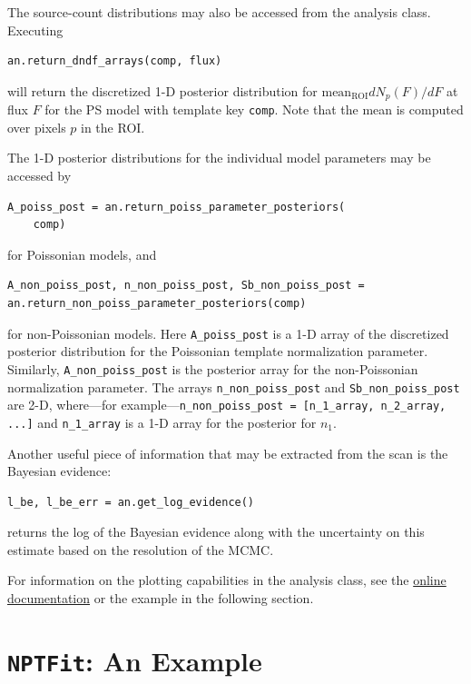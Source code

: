 The source-count distributions may also be accessed from the analysis class.  Executing
\begin{lstlisting}
an.return_dndf_arrays(comp, flux)
\end{lstlisting}
will return the discretized 1-D posterior distribution for $\text{mean}_\text{ROI} dN_p(F)/dF$ at flux $F$ for the PS model with template key \lstinline{comp}.  Note that the mean is computed over pixels $p$ in the ROI.  

The 1-D posterior distributions for the individual model parameters may be accessed by 
\begin{lstlisting}
A_poiss_post = an.return_poiss_parameter_posteriors(
    comp)
\end{lstlisting}
for Poissonian models, and 
\begin{lstlisting}
A_non_poiss_post, n_non_poiss_post, Sb_non_poiss_post = an.return_non_poiss_parameter_posteriors(comp)
\end{lstlisting}
for non-Poissonian models.  Here \lstinline{A_poiss_post} is a 1-D array of the discretized posterior distribution for the Poissonian template normalization parameter.  Similarly, \lstinline{A_non_poiss_post} is the posterior array for the non-Poissonian normalization parameter.  The arrays \lstinline{n_non_poiss_post} and \lstinline{Sb_non_poiss_post} are 2-D, where---for example---\mbox{\lstinline{n_non_poiss_post = [n_1_array, n_2_array, ...]}} and \lstinline{n_1_array} is a 1-D array for the posterior for $n_1$.   

Another useful piece of information that may be extracted from the scan is the Bayesian evidence:
\begin{lstlisting}
l_be, l_be_err = an.get_log_evidence()
\end{lstlisting}
returns the log of the Bayesian evidence along with the uncertainty on this estimate based on the resolution of the MCMC.

For information on the plotting capabilities in the analysis class, see the \href{http://nptfit.readthedocs.io}{online documentation} or the example in the following section.

\section{\texttt{NPTFit}: An Example}
\label{NPTFit-example}

